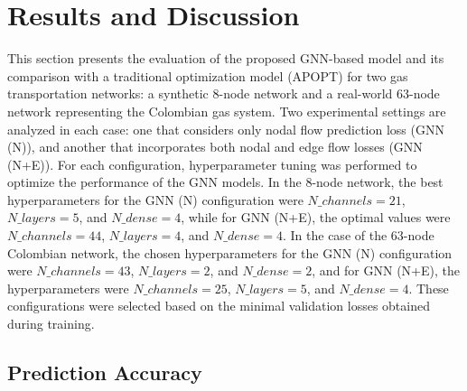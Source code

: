 %
%


\section{Results and Discussion}

This section presents the evaluation of the proposed GNN-based model and its comparison with a traditional optimization model (APOPT) for two gas transportation networks: a synthetic 8-node network and a real-world 63-node network representing the Colombian gas system. Two experimental settings are analyzed in each case: one that considers only nodal flow prediction loss (GNN (N)), and another that incorporates both nodal and edge flow losses (GNN (N+E)). For each configuration, hyperparameter tuning was performed to optimize the performance of the GNN models. In the 8-node network, the best hyperparameters for the GNN (N) configuration were $N\_channels=21$, $N\_layers=5$, and $N\_dense=4$, while for GNN (N+E), the optimal values were $N\_channels=44$, $N\_layers=4$, and $N\_dense=4$. In the case of the 63-node Colombian network, the chosen hyperparameters for the GNN (N) configuration were $N\_channels=43$, $N\_layers=2$, and $N\_dense=2$, and for GNN (N+E), the hyperparameters were $N\_channels=25$, $N\_layers=5$, and $N\_dense=4$. These configurations were selected based on the minimal validation losses obtained during training.

\subsection{Prediction Accuracy}

